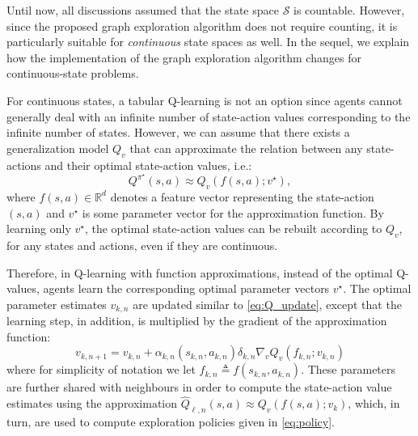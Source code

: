 \documentclass[lettersize,journal]{IEEEtran}
\begin{document}
Until now, all discussions  assumed that the state space $\mathcal{S}$ is countable. However, since the proposed graph exploration algorithm does not require counting, it is particularly suitable for {\em continuous} state spaces as well. In the sequel, we explain how the implementation of the graph exploration algorithm changes for continuous-state problems. \par  

For continuous states, a tabular Q-learning is not an option since agents cannot generally deal with an infinite number of state-action values corresponding to the infinite number of states. 
However,  we can assume that there exists a generalization model $Q_{v}$ that can approximate the relation between any state-actions and their optimal state-action values, i.e.: 
$$Q^{\pi^{\star}}(s,a)\approx Q_{v}(f(s,a); v^{\star}),$$ where $f(s,a)\in \mathbb{R}^d$ denotes a  feature vector representing the state-action $(s,a)$ and  $v^{\star}$ is some parameter vector for the approximation function. By learning only $v^{\star}$, the optimal state-action values can be rebuilt  according to  $Q_v$, for any states and actions, even if they are continuous. \par 
 Therefore, in Q-learning with function approximations, instead of the optimal Q-values, agents learn the corresponding optimal parameter vectors $v^{\star}$. The optimal parameter estimates  $v_{k,n}$  are updated similar to \eqref{eq:Q_update}, except that the learning step, in addition, is  multiplied by the gradient of the approximation function:
 $$v_{k,n+1}=v_{k,n}+\alpha_{k,n}(s_{k,n},a_{k,n}) \delta_{k,n} \nabla_{v}Q_{v}(f_{k,n};v_{k,n})$$
where  for simplicity of notation we let $f_{k,n}\triangleq f(s_{k,n},a_{k,n})$.  
These parameters are further shared with neighbours in order to compute the
 state-action value estimates using the approximation $\widehat{Q}_{\ell,n}(s,a)\approx Q_{v}(f(s,a);v_k)$, which, in turn, are used to compute exploration policies given in \eqref{eq:policy}. 

\end{document}

